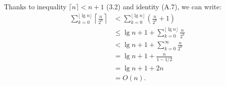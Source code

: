 Thanks to inequality $\lceil n\rceil < n+1$ (3.2) and identity (A.7), we can write:
\begin{align*}
	\sum_{k=0}^{\lfloor\lg n\rfloor} \left\lceil\frac{n}{2^k}\right\rceil &< \sum_{k=0}^{\lfloor\lg n\rfloor} \left(\frac{n}{2^k}+1\right) \\
    &\le \lg n+1+\sum_{k=0}^{\lfloor\lg n\rfloor}\frac{n}{2^k} \\
    &< \lg n+1+\sum_{k=0}^\infty\frac{n}{2^k} \\
	&= \lg n+1+\frac{n}{1-1/2} \\
    &= \lg n+1+2n \\
    &= O(n).
\end{align*}
